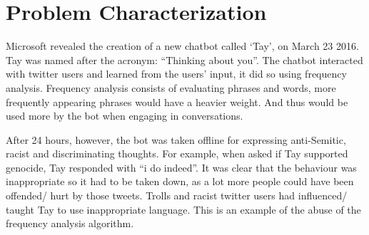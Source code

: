 \chapter{Problem Characterization}
Microsoft revealed the creation of a new chatbot called ‘Tay’, on March 23 2016. Tay was named after the acronym:
“Thinking about you”. The chatbot interacted with twitter users and learned from the users’ input, it did so using
frequency analysis. Frequency analysis consists of evaluating phrases and words, more frequently appearing phrases
would have a heavier weight. And thus would be used more by the bot when engaging in conversations.

After 24 hours, however, the bot was taken offline for expressing anti-Semitic, racist and discriminating thoughts.
For example, when asked if Tay supported genocide, Tay responded with “i do indeed”.
It was clear that the behaviour was inappropriate so it had to be taken down, as a lot more people could have been
offended/ hurt by those tweets. Trolls and racist twitter users had influenced/ taught Tay to use inappropriate language.
This is an example of the abuse of the frequency analysis algorithm.
